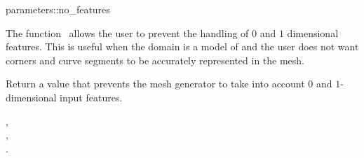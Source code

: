 \ccRefPageBegin


\begin{ccRefFunction}{parameters::no_features}  %


\ccDefinition
  
The function \ccRefName\ allows the user to prevent the handling 
of $0$ and $1$ dimensional features. This is useful when the
domain  is a model of  
and the user does not want corners and curve segments
 to be accurately represented
in the mesh.



{Return a  value that prevents the mesh generator
to take into account  $0$ and $1$-dimensional input features.}


\ccSeeAlso

, \\
, \\
.





\end{ccRefFunction}

\ccRefPageEnd

